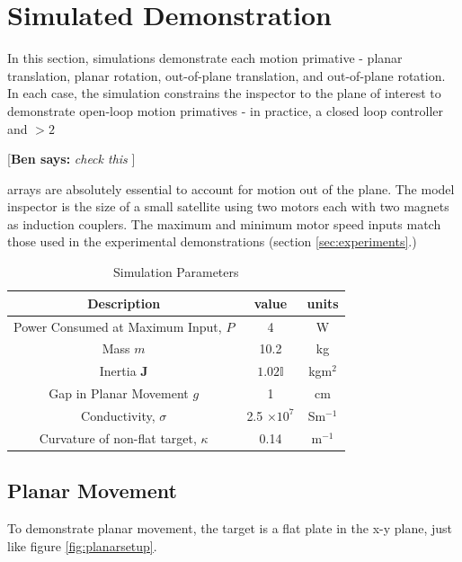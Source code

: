 \documentclass[letterpaper, 10 pt, conference]{ieeeconf}  %
\newcommand{\ben}[1]{{\color{red}\small\par {[{\bf Ben says:} {\em #1}} ] \\    }}
\begin{document}
\section{Simulated Demonstration}\label{sec:simulations}

In this section, simulations demonstrate each motion primative - planar translation, planar rotation, out-of-plane translation, and out-of-plane rotation. In each case, the simulation constrains the inspector to the plane of interest to demonstrate open-loop motion primatives - in practice, a closed loop controller and $>2$ \ben{check this} arrays are absolutely essential to account for motion out of the plane. The model inspector is the size of a small satellite using two motors each with two magnets as induction couplers. The maximum and minimum motor speed inputs match those used in the experimental demonstrations (section \ref{sec:experiments}.)     

\begin{table}[h]
\caption{Simulation Parameters}
\label{table: sim_params}
\begin{center}
\begin{tabular}{| c | c | c |}
\hline
Description & value & units \\
\hline \hline
Power Consumed at Maximum Input, $P$ & 4 & W \\ \hline

Mass $m$ & 10.2 & kg \\ \hline

Inertia $\textbf{J}$ & $1.02 \mathbb{I}$ & kgm$^2$ \\ \hline

Gap in Planar Movement $g$ & 1 & cm \\ \hline

Conductivity, $\sigma$ & 2.5 $\times 10^7$ & Sm$^{-1}$ \\ \hline

Curvature of non-flat target, $\kappa$  & 0.14 & m$^{-1}$\\

\hline
\end{tabular}
\end{center}
\end{table}

\subsection{Planar Movement}\label{sec:planar_movement_sim}
To demonstrate planar movement, the target is a flat plate in the x-y plane, just like figure \ref{fig:planarsetup}. 
  
\end{document}
